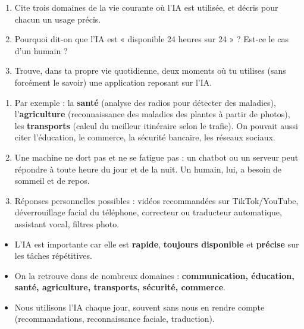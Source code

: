 \documentclass[11pt]{article}
\begin{document}
\begin{exercice}
\begin{enumerate}
\item Cite trois domaines de la vie courante où l'IA est utilisée, et décris pour chacun un usage précis.
\item Pourquoi dit-on que l'IA est « disponible 24 heures sur 24 » ? Est-ce le cas d'un humain ?
\item Trouve, dans ta propre vie quotidienne, deux moments où tu utilises (sans forcément le savoir) une application reposant sur l'IA.
\end{enumerate}
\end{exercice}

\begin{corrige}
\begin{enumerate}
\item Par exemple : la \textbf{santé} (analyse des radios pour détecter des maladies), l'\textbf{agriculture} (reconnaissance des maladies des plantes à partir de photos), les \textbf{transports} (calcul du meilleur itinéraire selon le trafic). On pouvait aussi citer l'éducation, le commerce, la sécurité bancaire, les réseaux sociaux.
\item Une machine ne dort pas et ne se fatigue pas : un chatbot ou un serveur peut répondre à toute heure du jour et de la nuit. Un humain, lui, a besoin de sommeil et de repos.
\item Réponses personnelles possibles : vidéos recommandées sur TikTok/YouTube, déverrouillage facial du téléphone, correcteur ou traducteur automatique, assistant vocal, filtres photo.
\end{enumerate}
\end{corrige}

\begin{aretenir}
\begin{itemize}
\item L'IA est importante car elle est \textbf{rapide}, \textbf{toujours disponible} et \textbf{précise} sur les tâches répétitives.
\item On la retrouve dans de nombreux domaines : \textbf{communication, éducation, santé, agriculture, transports, sécurité, commerce}.
\item Nous utilisons l'IA chaque jour, souvent sans nous en rendre compte (recommandations, reconnaissance faciale, traduction).
\end{itemize}
\end{aretenir}
\end{document}
